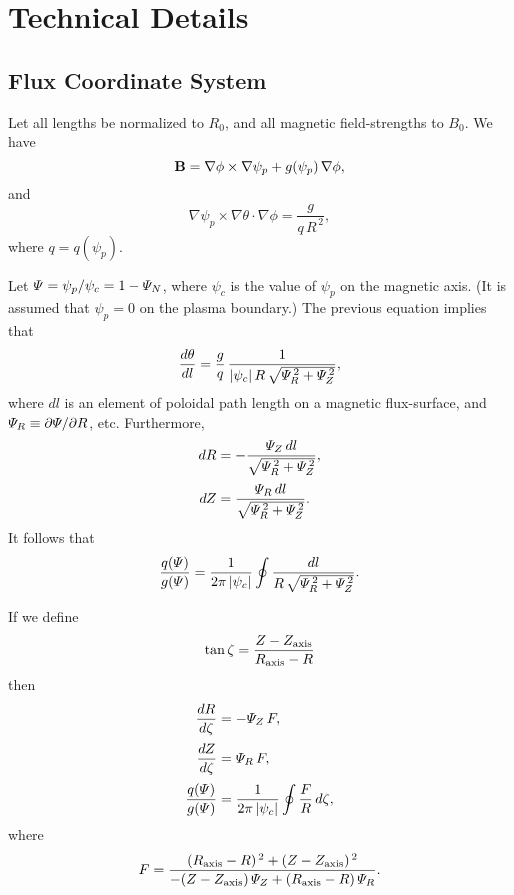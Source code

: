\documentclass[12pt]{article}
\begin{document}
\section{Technical Details}
\subsection{Flux Coordinate System}
Let all lengths be normalized to $R_0$, and all magnetic field-strengths to $B_0$. 
We have
\begin{equation}
{\bf B} =\nabla\phi\times \nabla\psi_p +g(\psi_p)\,\nabla\phi,
\end{equation}
and
\begin{equation}
\nabla\psi_p\times \nabla\theta\cdot\nabla\phi = \frac{g}{q\,R^{\,2}},
\end{equation}
where $q=q(\psi_p)$. 

Let ${\mit\Psi}=\psi_p/\psi_c = 1-{\mit\Psi}_N$, where $\psi_c$ is the value
of $\psi_p$ on the magnetic axis. (It is assumed that $\psi_p=0$ on the plasma boundary.) 
The previous equation implies that
\begin{equation}
\frac{d\theta}{dl} = \frac{g}{q}\,\frac{1}{|\psi_c|\,R\,\sqrt{{\mit\Psi}_R^{\,2}+{\mit\Psi}_Z^{\,2}}},
\end{equation}
where $dl$ is an element of poloidal path length on a magnetic flux-surface, and ${\mit\Psi}_R\equiv \partial{\mit\Psi}/\partial R$, etc. Furthermore,
\begin{align}
dR &= -\frac{{\mit\Psi}_Z\,dl}{\sqrt{{\mit\Psi}_R^{\,2}+{\mit\Psi}_Z^{\,2}}},\\[0.5ex]
dZ&= \frac{{\mit\Psi}_R\,dl}{\sqrt{{\mit\Psi}_R^{\,2}+{\mit\Psi}_Z^{\,2}}}.
\end{align}
It follows that
\begin{equation}
\frac{q({\mit\Psi})}{g({\mit\Psi})} = \frac{1}{2\pi\,|\psi_c|}\oint \frac{dl}{R\,\sqrt{{\mit\Psi}_R^{\,2}+{\mit\Psi}_Z^{\,2}}}.
\end{equation}

If we define
\begin{equation}
\tan\zeta = \frac{Z-Z_{\rm axis}}{R_{\rm axis}-R}
\end{equation}
then
\begin{align}
\frac{dR}{d\zeta} &= -{\mit\Psi}_Z\,F,\\[0.5ex]
\frac{dZ}{d\zeta} &= {\mit\Psi}_R\,F,\\[0.5ex]
\frac{q({\mit\Psi})}{g({\mit\Psi})} &= \frac{1}{2\pi\,|\psi_c|}\oint \frac{F}{R}\,d\zeta,
\end{align}
where
\begin{equation}
F = \frac{(R_{\rm axis}-R)^{\,2} + (Z-Z_{\rm axis})^{\,2}}{-(Z-Z_{\rm axis})\,{\mit\Psi}_Z + (R_{\rm axis}-R)\,{\mit\Psi}_R}.
\end{equation}
\end{document}

